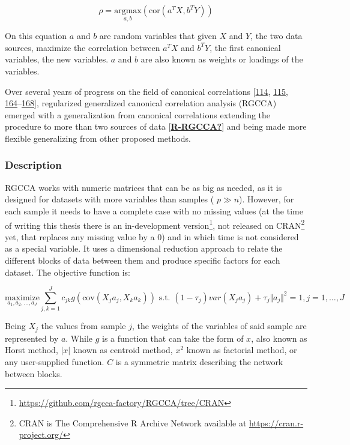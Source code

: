 \documentclass[
  12pt,
  a4paper,
  twoside,
  openright]{book}
\DeclareRobustCommand{\href}[2]{#2\footnote{\url{#1}}}
\begin{document}
\[
\rho = \underset{a, b}{\text{argmax}} (\text{cor}(a^T X, b^T Y))
\]

On this equation \(a\) and \(b\) are random variables that given \(X\) and \(Y\), the two data sources, maximize the correlation between \(a^T X\) and \(b^T Y\), the first canonical variables, the new variables.
\(a\) and \(b\) are also known as weights or loadings of the variables.

Over several years of progress on the field of canonical correlations {[}\protect\hyperlink{ref-tenenhaus_regularized_2011}{114}, \protect\hyperlink{ref-tenenhaus_variable_2014}{115}, \protect\hyperlink{ref-tenenhaus_component-based_2008}{164}--\protect\hyperlink{ref-gloaguen2020}{168}{]}, regularized generalized canonical correlation analysis (RGCCA) emerged with a generalization from canonical correlations extending the procedure to more than two sources of data {[}\protect\hyperlink{ref-R-RGCCA}{\textbf{R-RGCCA?}}{]} and being made more flexible generalizing from other proposed methods.

\hypertarget{description}{%
\subsubsection{Description}\label{description}}

RGCCA works with numeric matrices that can be as big as needed, as it is designed for datasets with more variables than samples ( \(p \gg n\)).
However, for each sample it needs to have a complete case with no missing values (at the time of writing this thesis there is an \href{https://github.com/rgcca-factory/RGCCA/tree/CRAN}{in-development version}, not released on CRAN\footnote{CRAN is The Comprehensive R Archive Network available at \url{https://cran.r-project.org/}} yet, that replaces any missing value by a 0) and in which time is not considered as a special variable.
It uses a dimensional reduction approach to relate the different blocks of data between them and produce specific factors for each dataset.
The objective function is:

\[
\underset{a_1,a_2, \dots,a_J}{\text{maximize}} \sum_{j, k = 1}^J c_{jk} g( \text{cov}(X_j a_j, X_k a_k)) \text{ s.t. } (1-\tau_j)var(X_j a_j)+\tau_j \Vert a_j \Vert^2 = 1, j=1, \ldots, J
\]

Being \(X_j\) the values from sample \(j\), the weights of the variables of said sample are represented by \(a\).
While \(g\) is a function that can take the form of \(x\), also known as Horst method, \(|x|\) known as centroid method, \(x^2\) known as factorial method, or any user-supplied function.
\(C\) is a symmetric matrix describing the network between blocks.
\end{document}
